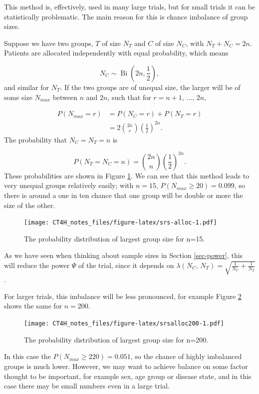 \documentclass[
  openany]{book}
\theoremstyle{definition}
\theoremstyle{definition}
\theoremstyle{definition}
\theoremstyle{definition}
\theoremstyle{remark}
\begin{document}
This method is, effectively, used in many large trials, but for small trials it can be statistically problematic. The main reason for this is chance imbalance of group sizes.

Suppose we have two groups, \(T\) of size \(N_T\) and \(C\) of size \(N_C\), with \(N_T + N_C = 2n\). Patients are allocated independently with equal probability, which means

\[N_C \sim \operatorname{Bi}\left(2n,\frac{1}{2}\right), \]
and similar for \(N_T\). If the two groups are of unequal size, the larger will be of some size \(N_{max}\) between \(n\) and \(2n\), such that for \(r = n+1,\,\ldots,\,2n,\)

\begin{align*}
P\left(N_{max} = r\right) & = P\left(N_C = r\right) + P\left(N_T = r\right) \\
& = 2\binom{2n}{r}\left(\frac{1}{2}\right)^{2n}.
\end{align*}
The probability that \(N_C = N_T = n\) is

\[ P\left(N_T = N_C = n\right)= \binom{2n}{n}\left(\frac{1}{2}\right)^{2n}. \]
These probabilities are shown in Figure \ref{fig:srs-alloc}. We can see that this method leads to very unequal groups relatively easily; with \(n=15\), \(P\left(N_{max}\geq 20\right) = 0.099\), so there is around a one in ten chance that one group will be double or more the size of the other.

\begin{figure}
\centering
\texttt{[image: CT4H\_notes\_files/figure-latex/srs-alloc-1.pdf]}
\caption{\label{fig:srs-alloc}The probability distribution of largest group size for n=15.}
\end{figure}

As we have seen when thinking about sample sizes in Section \ref{sec-power}, this will reduce the power \(\Psi\) of the trial, since it depends on \(\lambda\left(N_C,\,N_T\right) = \sqrt{\frac{1}{N_C} + \frac{1}{N_T}}\).

For larger trials, this imbalance will be less pronounced, for example Figure \ref{fig:srsalloc200} shows the same for \(n=200\).

\begin{figure}
\centering
\texttt{[image: CT4H\_notes\_files/figure-latex/srsalloc200-1.pdf]}
\caption{\label{fig:srsalloc200}The probability distribution of largest group size for n=200.}
\end{figure}

In this case the \(P\left(N_{max} \geq 220\right)=0.051\), so the chance of highly imbalanced groups is much lower. However, we may want to achieve balance on some factor thought to be important, for example sex, age group or disease state, and in this case there may be small numbers even in a large trial.
\end{document}
